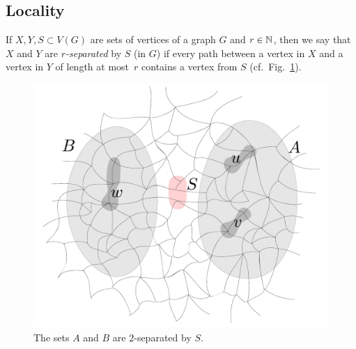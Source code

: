 \subsection{Locality}
If $X,Y,S\subset V(G)$ are sets of vertices of a graph $G$ 
and $r\in \mathbb{N}$, then we say that $X$ and $Y$ are  \emph{$r$-separated}
by $S$  (in $G$) if every path between a vertex in $X$ and a vertex in 
$Y$ of length at most~$r$ contains a vertex from $S$ (cf.~Fig.~\ref{fig:sep}).

\begin{figure}[h!]
	\centering
		\includegraphics[scale=0.35,page=1]{pics}
	\caption{The sets $A$ and $B$ are $2$-separated by $S$.
	}
	\label{fig:sep}
\end{figure}



